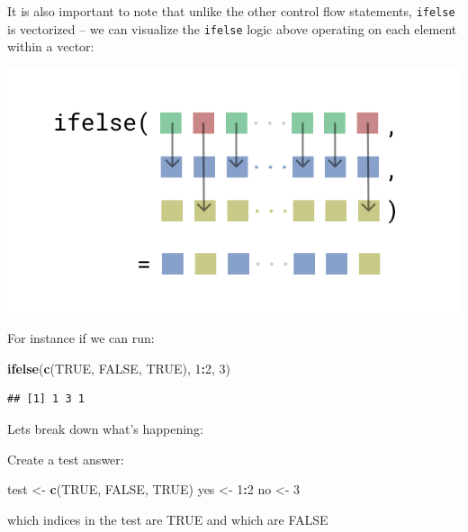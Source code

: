 \documentclass[]{book}
\newenvironment{Shaded}{\begin{snugshade}}{\end{snugshade}}
\newcommand{\DecValTok}[1]{\textcolor[rgb]{0.00,0.00,0.81}{#1}}
\newcommand{\KeywordTok}[1]{\textcolor[rgb]{0.13,0.29,0.53}{\textbf{#1}}}
\newcommand{\NormalTok}[1]{#1}
\newcommand{\OperatorTok}[1]{\textcolor[rgb]{0.81,0.36,0.00}{\textbf{#1}}}
\newcommand{\OtherTok}[1]{\textcolor[rgb]{0.56,0.35,0.01}{#1}}
\newcommand{\StringTok}[1]{\textcolor[rgb]{0.31,0.60,0.02}{#1}}
\begin{document}
It is also important to note that unlike the other control flow statements, \texttt{ifelse} is vectorized -- we can visualize the \texttt{ifelse} logic above operating on each element within a vector:

\begin{center}\includegraphics[width=9.76in]{images/ifelse} \end{center}

For instance if we can run:

\begin{Shaded}
\begin{Highlighting}[]
\KeywordTok{ifelse}\NormalTok{(}\KeywordTok{c}\NormalTok{(}\OtherTok{TRUE}\NormalTok{, }\OtherTok{FALSE}\NormalTok{, }\OtherTok{TRUE}\NormalTok{), }\DecValTok{1}\OperatorTok{:}\DecValTok{2}\NormalTok{, }\DecValTok{3}\NormalTok{)}
\end{Highlighting}
\end{Shaded}

\begin{verbatim}
## [1] 1 3 1
\end{verbatim}

Lets break down what's happening:

Create a test answer:

\begin{Shaded}
\begin{Highlighting}[]
\NormalTok{test <-}\StringTok{ }\KeywordTok{c}\NormalTok{(}\OtherTok{TRUE}\NormalTok{, }\OtherTok{FALSE}\NormalTok{, }\OtherTok{TRUE}\NormalTok{)}
\NormalTok{yes <-}\StringTok{ }\DecValTok{1}\OperatorTok{:}\DecValTok{2}
\NormalTok{no <-}\StringTok{ }\DecValTok{3}
\end{Highlighting}
\end{Shaded}

which indices in the test are TRUE and which are FALSE
\end{document}

